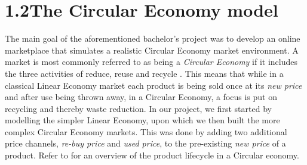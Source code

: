 
\section*{1.2\space\space The Circular Economy model}\label{sec:CircularEconomy}

The main goal of the aforementioned bachelor's project was to develop an online marketplace that simulates a realistic Circular Economy market environment. A market is most commonly referred to as being a \emph{Circular Economy} if it includes the three activities of reduce, reuse and recycle \cite{circularEconomyDefinition}. This means that while in a classical Linear Economy market each product is being sold once at its \emph{new price} and after use being thrown away, in a Circular Economy, a focus is put on recycling and thereby waste reduction. In our project, we first started by modelling the simpler Linear Economy, upon which we then built the more complex Circular Economy markets. This was done by adding two additional price channels, \emph{re-buy price} and \emph{used price}, to the pre-existing \emph{new price} of a product. Refer to  for an overview of the product lifecycle in a Circular economy.

